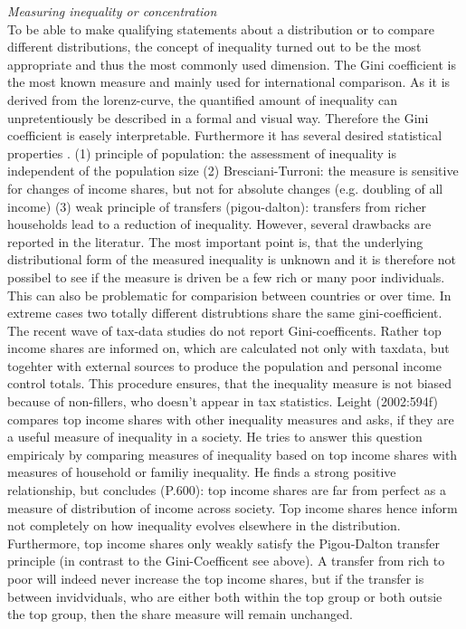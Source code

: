 \documentclass[twoside]{article}\usepackage[]{graphicx}\usepackage[]{color}
\begin{document}
\begin{multicols}{2}
\emph{Measuring inequality or concentration} \\
To be able to make qualifying statements about a distribution or to compare different distributions, the concept of inequality turned out to be the most appropriate and thus the most commonly used dimension. The Gini coefficient is the most known measure and mainly used for international comparison. As it is derived from the lorenz-curve, the quantified amount of inequality can unpretentiously be described in a formal and visual way. Therefore the Gini coefficient is easely interpretable. Furthermore it has several desired statistical properties \citet{engelhardt_modelle_2000}. (1) principle of population: the assessment of inequality is independent of the population size (2) Bresciani-Turroni: the measure is sensitive for changes of income shares, but not for absolute changes (e.g. doubling of all income) (3) weak principle of transfers (pigou-dalton): transfers from richer households lead to a reduction of inequality. However, several drawbacks are reported in the literatur. The most important point is, that the underlying distributional form of the measured inequality is unknown and it is therefore not possibel to see if the measure is driven be a few rich or many poor individuals. This can also be problematic for comparision between countries or over time. In extreme cases two totally different distrubtions share the same gini-coefficient.\\

The recent wave of tax-data studies do not report Gini-coefficents. Rather top income shares are informed on, which are calculated not only with taxdata, but togehter with external sources to produce the population and personal income control totals. This procedure ensures, that the inequality measure is not biased because of non-fillers, who doesn't appear in tax statistics.  Leight (2002:594f) compares top income shares with other inequality measures and asks, if they are a useful measure of inequality in a society. He tries to answer this question empiricaly by comparing measures of inequality based on top income shares with measures of household or familiy inequality. He finds a strong positive relationship, but concludes (P.600): top income shares are far from perfect as a measure of distribution of income across society. Top income shares hence inform not completely on how inequality evolves elsewhere in the distribution. Furthermore, top income shares only weakly satisfy the Pigou-Dalton transfer principle (in contrast to the Gini-Coefficent see above). A transfer from rich to poor will indeed never increase the top income shares, but if the transfer is between invidviduals, who are either both within the top group or both outsie the top group, then the share measure will remain unchanged. \\


\end{multicols}
\end{document}
